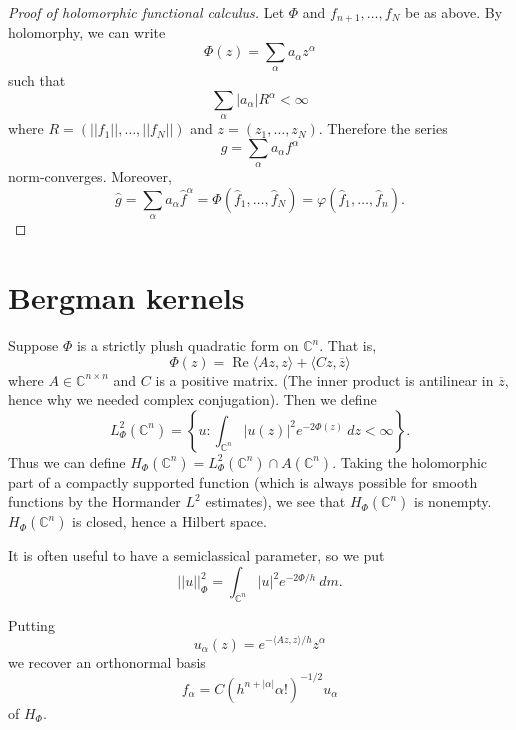 \documentclass[12pt]{report}
\newcommand{\CC}{\mathbb{C}}
\renewcommand{\Re}{\operatorname{Re}}
\theoremstyle{definition}
\begin{document}
\begin{proof}[Proof of holomorphic functional calculus]
    Let $\Phi$ and $f_{n+1}, \dots, f_N$ be as above. By holomorphy, we can write
    $$\Phi(z) = \sum_\alpha a_\alpha z^\alpha$$
    such that
    $$\sum_\alpha |a_\alpha| R^\alpha < \infty$$
    where $R = (||f_1||, \dots, ||f_N||)$ and $z = (z_1, \dots, z_N)$. Therefore the series
    $$g = \sum_\alpha a_\alpha f^\alpha$$
    norm-converges. Moreover,
    $$\hat g = \sum_\alpha a_\alpha \hat f^\alpha = \Phi(\hat f_1, \dots, \hat f_N) = \varphi(\hat f_1, \dots , \hat f_n).$$
\end{proof}
    

\chapter{Bergman kernels}
Suppose $\Phi$ is a strictly plush quadratic form on $\CC^n$. That is,
$$\Phi(z) = \Re \langle Az, z\rangle + \langle Cz, \overline z \rangle$$
where $A \in \CC^{n \times n}$ and $C$ is a positive matrix. (The inner product is antilinear in $\overline z$, hence why we needed complex conjugation). Then we define
$$L^2_\Phi(\CC^n) = \left\{u: \int_{\CC^n} |u(z)|^2 e^{-2\Phi(z)} ~dz < \infty\right\}.$$
Thus we can define $H_\Phi(\CC^n) = L^2_\Phi(\CC^n) \cap A(\CC^n)$. Taking the holomorphic part of a compactly supported function (which is always possible for smooth functions by the Hormander $L^2$ estimates), we see that $H_\Phi(\CC^n)$ is nonempty. $H_\Phi(\CC^n)$ is closed, hence a Hilbert space.

It is often useful to have a semiclassical parameter, so we put
$$||u||_\Phi^2 = \int_{\CC^n} |u|^2 e^{-2\Phi/h} ~dm.$$

Putting
$$u_\alpha(z) = e^{-\langle Az, z\rangle/h} z^\alpha$$
we recover an orthonormal basis
$$f_\alpha = C (h^{n + |\alpha|} \alpha!)^{-1/2}u_\alpha$$
of $H_\Phi$. 
\end{document}
